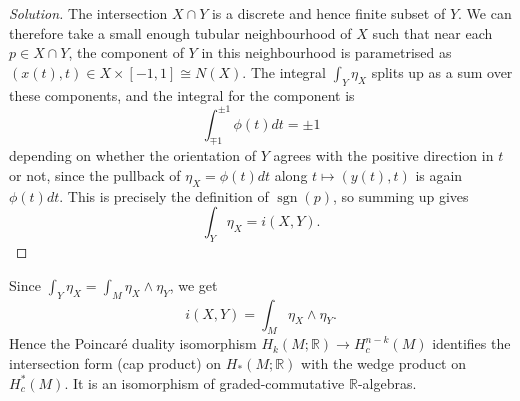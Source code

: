 \documentclass[a4paper]{article}
\theoremstyle{definition}
\theoremstyle{remark}
\DeclareMathOperator{\sgn}{sgn}
\newcommand{\R}{\mathbb{R}}
\begin{document}
\begin{proof}[Solution]
    The intersection $X\cap Y$ is a discrete and hence finite subset of $Y$.
    We can therefore take a small enough tubular neighbourhood of $X$ such that
    near each $p\in X\cap Y$, the component of $Y$ in this neighbourhood is parametrised as
    $(x(t),t)\in X\times[-1,1]\cong N(X)$. The integral $\int_Y\eta_X$ splits
    up as a sum over these components, and the integral for the component is
    \begin{equation*}
        \int_{\mp1}^{\pm1}\phi(t)dt = \pm1
    \end{equation*}
    depending on whether the orientation of $Y$ agrees with the positive
    direction in $t$ or not, since the pullback of $\eta_X=\phi(t)dt$ along
    $t\mapsto(y(t),t)$ is again $\phi(t)dt$. This is precisely the definition
    of $\sgn(p)$, so summing up gives
    \begin{equation*}
        \int_Y\eta_X = i(X,Y).
    \end{equation*}
\end{proof}

Since $\int_Y\eta_X=\int_M\eta_X\wedge\eta_Y$, we get
\begin{equation*}
    i(X,Y) = \int_M\eta_X\wedge\eta_Y.
\end{equation*}
Hence the Poincar\'e duality isomorphism $H_k(M;\R)\to H^{n-k}_c(M)$ identifies
the intersection form (cap product) on $H_*(M;\R)$ with the wedge product on
$H^*_c(M)$. It is an isomorphism of graded-commutative $\R$-algebras.
\end{document}
